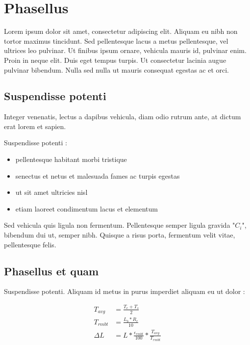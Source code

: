 \section{Phasellus} \label{sec:phasellus}

Lorem ipsum dolor sit amet, consectetur adipiscing elit. Aliquam eu nibh non
tortor maximus tincidunt. Sed pellentesque lacus a metus pellentesque, vel
ultrices leo pulvinar. Ut finibus ipsum ornare, vehicula mauris id, pulvinar
enim. Proin in neque elit. Duis eget tempus turpis. Ut consectetur lacinia
augue pulvinar bibendum. Nulla sed nulla ut mauris consequat egestas ac et orci.

\subsection{Suspendisse potenti}

Integer venenatis, lectus a dapibus vehicula, diam odio rutrum ante, at dictum
erat lorem et sapien.

Suspendisse potenti :

\begin{itemize}
\item{pellentesque habitant morbi tristique}
\item{senectus et netus et malesuada fames ac turpis egestas}
\item{ut sit amet ultricies nisl}
\item{etiam laoreet condimentum lacus et elementum}
\end{itemize}

Sed vehicula quis ligula non fermentum. Pellentesque semper ligula gravida "$C_i$",
bibendum dui ut, semper nibh. Quisque a risus porta, fermentum velit vitae,
pellentesque felis.

\newpage
\subsection{Phasellus et quam}

Suspendisse potenti. Aliquam id metus in purus imperdiet aliquam eu ut dolor :

\begin{highlight}
\begin{align}
T_{avg}  &= \frac{T_e + T_s}{2} \\
T_{rmbt} &= \frac{L_b * R_r}{10} \\
\Delta L &= L * \frac{\epsilon_{rmbt}}{100} * \frac{T_{avg}}{T_{rmbt}}
\end{align}
\end{highlight}

